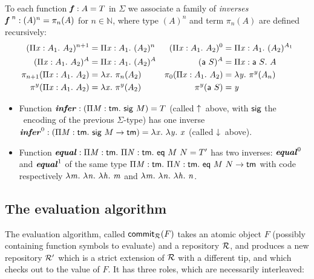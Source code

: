 \documentclass{llncs}
\begin{document}
\begin{definition}
  To each function $\fct f : A = T$ in $\Sigma$ we associate a family
  of \emph{inverses} $\fcti f {\;n} : (A)^n = \pi_n(A)$ for $n\in\mathbb
  N$, where type $(A)^n$ and term $\pi_n(A)$ are defined recursively:
  \begin{align*}
    (\prd x {A_1} {A_2})^{n+1} &= \prd x {A_1} (A_2)^n &
    (\prd x {A_1} {A_2})^0 &= \prd x {A_1} (A_2)^{A_1} \\
    (\prd x {A_1} {A_2})^A &= \prd x {A_1} (A_2)^A &
    (\app {\cst a} S)^A &= \prd x {\app{\cst a} S} A \\
    \pi_{n+1}(\prd x {A_1}{A_2}) &= \lam x \pi_n(A_2) &
    \pi_0(\prd x {A_1} {A_2}) &= \lam {y} \pi^y(A_n) \\
    \pi^y(\prd x {A_1}{A_2}) &= \lam x \pi^y (A_2) &
    \pi^y(\app{\cst a} S) &= \var y
  \end{align*}
\end{definition}

\begin{example}
  \begin{itemize}
  \item
    Function $\fct{infer} : (\prd M {\cst{tm}} \app{\cst{sig}} M)
    = T$ (called $\finfer{}$ above, with $\cst{sig}$ the \LF\ encoding
    of the previous $\Sigma$-type) has one inverse $\fcti{infer}{0} :
    (\prd M {\cst{tm}} {\app{\cst{sig}} M} \to \cst{tm}) = \lam x \lam
    y \var x$ (called $\fget{}$ above).
  \item
    Function $\fct{equal} : \prd M {\cst{tm}} \prd N {\cst{tm}}
    \app{\cst{eq}}\app M N = T'$ has two inverses: $\fcti{equal}{0}$
    and $\fcti{equal}{1}$ of the same type $\prd M {\cst{tm}} \prd N
    {\cst{tm}} \app{\cst{eq}}\app M N \to \cst{tm}$ with code
    respectively $\lam m \lam n \lam h \var m$ and $\lam m \lam n \lam
    h \var n$.
  \end{itemize}
\end{example}

\subsection{The evaluation algorithm}
\label{sec:eval}

The evaluation algorithm, called $\function{commit$_\mr$}{F}$ takes an
atomic object $F$ (possibly containing function symbols to evaluate)
and a repository $\mr$, and produces a new repository $\mr'$ which is
a strict extension of $\mr$ with a different tip, and which checks out
to the value of $F$. It has three roles, which are necessarily
interleaved:
\end{document}
